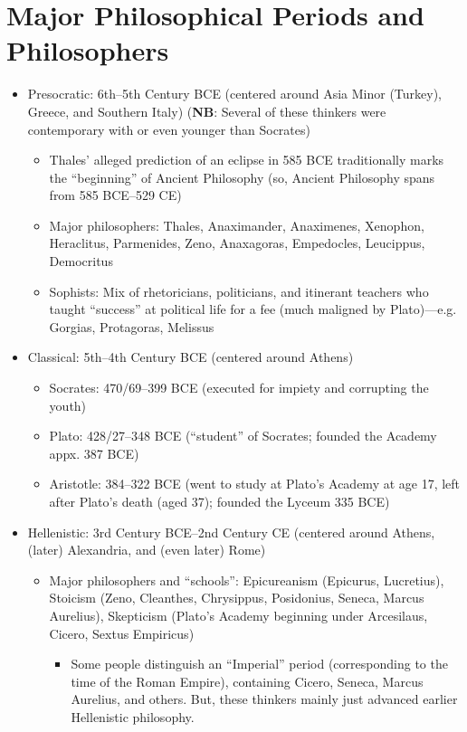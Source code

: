 \documentclass[11pt]{article}
\begin{document}
\section*{Major Philosophical Periods and Philosophers}
\begin{itemize}
\item{Presocratic: 6th--5th Century BCE (centered around Asia Minor (Turkey), Greece, and Southern Italy) (\textbf{NB}: Several of these thinkers were contemporary with or even younger than Socrates)}
\begin{itemize}\item{Thales' alleged prediction of an eclipse in 585 BCE traditionally marks the ``beginning'' of Ancient Philosophy} (so, Ancient Philosophy spans from 585 BCE--529 CE)\end{itemize}
\begin{itemize}
\item{Major philosophers: Thales, Anaximander, Anaximenes, Xenophon, Heraclitus, Parmenides, Zeno, Anaxagoras, Empedocles, Leucippus, Democritus}
\item{Sophists: Mix of rhetoricians, politicians, and itinerant teachers who taught ``success'' at political life for a fee (much maligned by Plato)---e.g. Gorgias, Protagoras, Melissus}
\end{itemize}
\item{Classical: 5th--4th Century BCE (centered around Athens)}
\begin{itemize}
\item{Socrates: 470/69--399 BCE (executed for impiety and corrupting the youth)}\item{Plato: 428/27--348 BCE (``student'' of Socrates; founded the Academy appx. 387 BCE)}\item{Aristotle: 384--322 BCE (went to study at Plato's Academy at age 17, left after Plato's death (aged 37); founded the Lyceum 335 BCE)}
\end{itemize}
\item{Hellenistic: 3rd Century BCE--2nd Century CE (centered around Athens, (later) Alexandria, and (even later) Rome)}
\begin{itemize}
\item{Major philosophers and ``schools'': Epicureanism (Epicurus, Lucretius), Stoicism (Zeno, Cleanthes, Chrysippus, Posidonius, Seneca, Marcus Aurelius), Skepticism (Plato's Academy beginning under Arcesilaus, Cicero, Sextus Empiricus)}
\begin{itemize}\item{Some people distinguish an ``Imperial'' period (corresponding to the time of the Roman Empire), containing Cicero, Seneca, Marcus Aurelius, and others. But, these thinkers mainly just advanced earlier Hellenistic philosophy.}\end{itemize}

\end{itemize}
\end{itemize}
\end{document}
